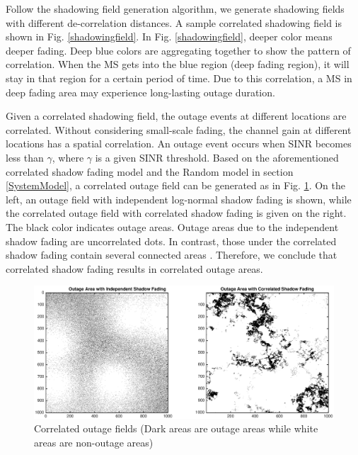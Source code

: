 \documentclass[journal,10pt]{IEEEtran}
\begin{document}
Follow the shadowing field generation algorithm, we generate shadowing fields with different  de-correlation distances. A sample correlated shadowing field is shown in Fig. \ref{shadowingfield}. In Fig. \ref{shadowingfield}, deeper color means deeper fading. Deep blue colors are aggregating together to show the pattern of correlation. When the MS gets into the blue region (deep fading region), it will stay in that region for a certain period of time. Due to this correlation, a MS in deep fading area may experience long-lasting outage duration.
\par Given a correlated shadowing field, the outage events at different locations are correlated. Without considering small-scale fading, the channel gain at different locations has a spatial correlation. An outage event occurs when SINR becomes less than $\gamma$, where $\gamma$ is a given SINR threshold. Based on the aforementioned correlated shadow fading model and the Random model in section \ref{SystemModel}, a correlated outage field can be generated as in Fig. \ref{4:outagefie}. On the left, an outage field with independent log-normal shadow fading is shown, while the correlated outage field with correlated shadow fading is given on the right. The black color indicates outage areas. Outage areas due to the independent shadow fading are uncorrelated dots. In contrast, those under the correlated shadow fading contain several connected areas . Therefore, we conclude that correlated shadow fading results in correlated outage areas.

 \begin{figure}
 \centering
 \includegraphics[width=14cm]{outageArea.eps}
 \caption{Correlated outage fields (Dark areas are outage areas while white areas are non-outage areas)}
 \label{4:outagefie}
 \end{figure}
\end{document}
